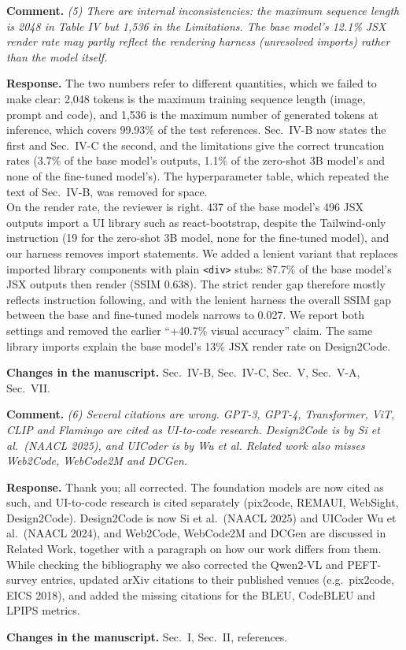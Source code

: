 \documentclass[11pt,a4paper]{article}
\newcommand{\rev}[1]{\par\noindent\textbf{Comment.} \textit{#1}\par}
\newcommand{\resp}{\par\noindent\textbf{Response.} }
\newcommand{\change}[1]{\par\noindent\textbf{Changes in the manuscript.} #1\par\medskip}
\begin{document}
\rev{(5) There are internal inconsistencies: the maximum sequence length is 2048
in Table IV but 1,536 in the Limitations. The base model's 12.1\% JSX render
rate may partly reflect the rendering harness (unresolved imports) rather than
the model itself.}
\resp The two numbers refer to different quantities, which we failed to make
clear: 2,048 tokens is the maximum training sequence length (image, prompt and
code), and 1,536 is the maximum number of generated tokens at inference, which
covers 99.93\% of the test references. Sec.~IV-B now states the first and
Sec.~IV-C the second, and the limitations give the correct truncation rates
(3.7\% of the base model's outputs, 1.1\% of the zero-shot 3B model's and none of
the fine-tuned model's). The hyperparameter table, which repeated the text of
Sec.~IV-B, was removed for space.\\
On the render rate, the reviewer is right. 437 of the base model's 496 JSX outputs
import a UI library such as react-bootstrap, despite the Tailwind-only
instruction (19 for the zero-shot 3B model, none for the fine-tuned model), and
our harness removes import statements. We added a lenient variant that replaces
imported library components with plain \texttt{<div>} stubs: 87.7\% of the base
model's JSX outputs then render (SSIM 0.638). The strict render gap therefore
mostly reflects instruction following, and with the lenient harness the overall
SSIM gap between the base and fine-tuned models narrows to 0.027. We report both
settings and removed the earlier ``+40.7\% visual accuracy'' claim. The same
library imports explain the base model's 13\% JSX render rate on Design2Code.
\change{Sec.~IV-B, Sec.~IV-C, Sec.~V, Sec.~V-A, Sec.~VII.}

\rev{(6) Several citations are wrong. GPT-3, GPT-4, Transformer, ViT, CLIP and
Flamingo are cited as UI-to-code research. Design2Code is by Si et al.\ (NAACL
2025), and UICoder is by Wu et al. Related work also misses Web2Code, WebCode2M
and DCGen.}
\resp Thank you; all corrected. The foundation models are now cited as such, and
UI-to-code research is cited separately (pix2code, REMAUI, WebSight,
Design2Code). Design2Code is now Si et al.\ (NAACL 2025) and UICoder Wu et al.\
(NAACL 2024), and Web2Code, WebCode2M and DCGen are discussed in Related Work,
together with a paragraph on how our work differs from them. While checking the
bibliography we also corrected the Qwen2-VL and PEFT-survey entries, updated
arXiv citations to their published venues (e.g.\ pix2code, EICS 2018), and added
the missing citations for the BLEU, CodeBLEU and LPIPS metrics.
\change{Sec.~I, Sec.~II, references.}
\end{document}
